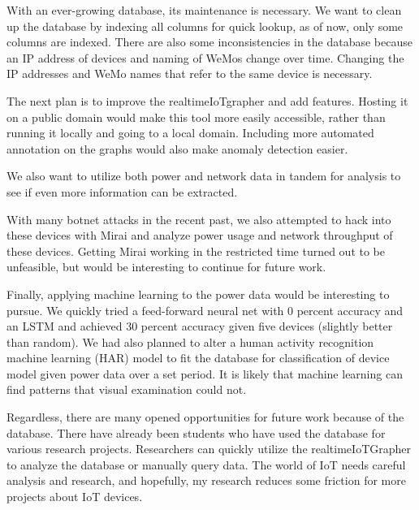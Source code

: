 With an ever-growing database, its maintenance is necessary. We want to clean up the database by indexing all columns for quick lookup, as of now, only some columns are indexed. There are also some inconsistencies in the database because an IP address of devices and naming of WeMos change over time. Changing the IP addresses and WeMo names that refer to the same device is necessary.

The next plan is to improve the realtimeIoTgrapher and add features. Hosting it on a public domain would make this tool more easily accessible, rather than running it locally and going to a local domain. Including more automated annotation on the graphs would also make anomaly detection easier.

We also want to utilize both power and network data in tandem for analysis to see if even more information can be extracted.

With many botnet attacks in the recent past, we also attempted to hack into these devices with Mirai and analyze power usage and network throughput of these devices. Getting Mirai working in the restricted time turned out to be unfeasible, but would be interesting to continue for future work.

Finally, applying machine learning to the power data would be interesting to pursue. We quickly tried a feed-forward neural net with 0 percent accuracy and an LSTM and achieved 30 percent accuracy given five devices (slightly better than random). We had also planned to alter a human activity recognition machine learning (HAR) model to fit the database for classification of device model given power data over a set period. It is likely that machine learning can find patterns that visual examination could not.

Regardless, there are many opened opportunities for future work because of the database. There have already been students who have used the database for various research projects. Researchers can quickly utilize the realtimeIoTGrapher to analyze the database or manually query data. The world of IoT needs careful analysis and research, and hopefully, my research reduces some friction for more projects about IoT devices.
